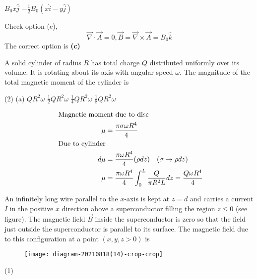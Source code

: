 \begin{enumerate}
\begin{tasks}
		\task[\textbf{C.}] $B_{0} x \hat{j}$
		\task[\textbf{D.}]$-\frac{1}{2} B_{0}(x \hat{i}-y \hat{j})$
	\end{tasks}
	\begin{answer}
		Check option (c),
		$$
		\vec{\nabla} \cdot \vec{A}=0, \vec{B}=\vec{\nabla} \times \vec{A}=B_{0} \hat{k}
		$$
		The correct option is \textbf{(c)}
	\end{answer}
	\begin{minipage}{\textwidth}
		\item  A solid cylinder of radius $R$ has total charge $Q$ distributed uniformly over its volume. It is rotating about its axis with angular speed $\omega$. The magnitude of the total magnetic moment of the cylinder is
	\end{minipage}
	\begin{tasks}(2)
		\task[\textbf{A.}](a) $Q R^{2} \omega$
		\task[\textbf{B.}]$\frac{1}{2} Q R^{2} \omega$
		\task[\textbf{C.}]$\frac{1}{4} Q R^{2} \omega$
		\task[\textbf{D.}]$\frac{1}{8} Q R^{2} \omega$
	\end{tasks}
	\begin{answer}
\begin{align*}
	\intertext{	Magnetic moment due to disc} 
\mu&=\frac{\pi \sigma \omega R^{4}}{4}\\
\text{	Due to cylinder}\\
 d \mu&=\frac{\pi \omega R^{4}}{4}(\rho d z) \quad(\sigma \rightarrow \rho d z)\\
\mu&=\frac{\pi \omega R^{4}}{4} \int_{0}^{L} \frac{Q}{\pi R^{2} L} d z=\frac{Q \omega R^{4}}{4}	
\end{align*}
	\end{answer}
	\begin{minipage}{\textwidth}
		\item An infinitely long wire parallel to the $x$-axis is kept at $z=d$ and carries a current $I$ in the positive $x$ direction above a superconductor filling the region $z \leq 0$ (see figure). The magnetic field $\vec{B}$ inside the superconductor is zero so that the field just outside the superconductor is parallel to its surface. The magnetic field due to this configuration at a point $(x, y, z>0)$ is
		\begin{figure}[H]
			\centering
			\texttt{[image: diagram-20210818(14)-crop-crop]}
			\caption{}
			\label{}
		\end{figure}
	\end{minipage}
	\begin{tasks}(1)

\end{tasks}
\end{enumerate}
